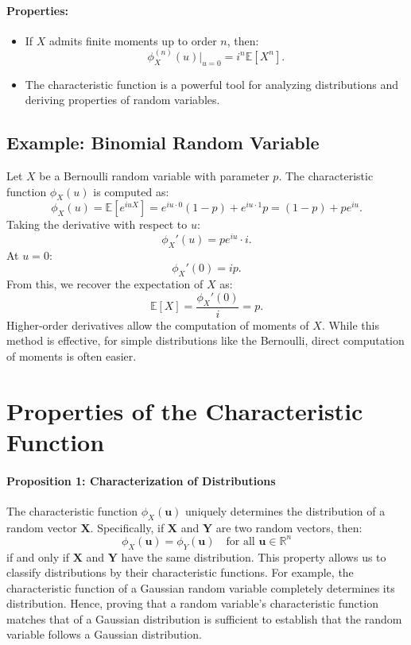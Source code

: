 \paragraph{Properties:}
\begin{itemize}
    \item If \( X \) admits finite moments up to order \( n \), then:
\[
\phi_X^{(n)}(u) \big|_{u=0} = i^n \mathbb{E}[X^n].
\]
    \item The characteristic function is a powerful tool for analyzing distributions and deriving properties of random variables.
\end{itemize}

\subsection{Example: Binomial Random Variable}

Let \( X \) be a Bernoulli random variable with parameter \( p \). The characteristic function \( \phi_X(u) \) is computed as:
\[
\phi_X(u) = \mathbb{E}\left[e^{i u X}\right] = e^{i u \cdot 0}(1 - p) + e^{i u \cdot 1}p = (1 - p) + p e^{i u}.
\]
Taking the derivative with respect to \( u \):
\[
\phi_X'(u) = p e^{i u} \cdot i.
\]
At \( u = 0 \):
\[
\phi_X'(0) = i p.
\]
From this, we recover the expectation of \( X \) as:
\[
\mathbb{E}[X] = \frac{\phi_X'(0)}{i} = p.
\]
Higher-order derivatives allow the computation of moments of \( X \). While this method is effective, for simple distributions like the Bernoulli, direct computation of moments is often easier.


\section{Properties of the Characteristic Function}
    
    \paragraph{Proposition 1: Characterization of Distributions}
    The characteristic function \( \phi_X(\mathbf{u}) \) uniquely determines the distribution of a random vector \( \mathbf{X} \). Specifically, if \( \mathbf{X} \) and \( \mathbf{Y} \) are two random vectors, then:
    \[
    \phi_X(\mathbf{u}) = \phi_Y(\mathbf{u}) \quad \text{for all } \mathbf{u} \in \mathbb{R}^n
    \]
    if and only if \( \mathbf{X} \) and \( \mathbf{Y} \) have the same distribution. \newline
    This property allows us to classify distributions by their characteristic functions. For example, the characteristic function of a Gaussian random variable completely determines its distribution. Hence, proving that a random variable's characteristic function matches that of a Gaussian distribution is sufficient to establish that the random variable follows a Gaussian distribution.
    
